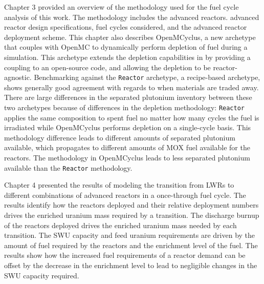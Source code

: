 Chapter 3 provided an overview of the methodology used for the fuel 
cycle analysis of this work. The methodology includes the 
advanced reactors. advanced reactor design specifications,
fuel cycles considered, and the 
advanced reactor deployment scheme. This chapter also 
describes OpenMCyclus, a new archetype that couples \Cyclus with 
OpenMC to dynamically perform depletion of fuel during a simulation. 
This archetype extends the depletion capabilities in 
\Cyclus by providing a coupling to an open-source code, and 
allowing the depletion to be reactor-agnostic. 
Benchmarking against the \Cycamore \texttt{Reactor} archetype, 
a recipe-based archetype, shows generally good agreement with 
regards to when materials are traded away. There 
are large differences in the separated plutonium inventory between 
these two archetypes because of differences in the 
depletion methodology: \Cycamore \texttt{Reactor} applies the 
same composition to spent fuel no matter how many cycles the 
fuel is irradiated while OpenMCyclus performs depletion on a 
single-cycle basis. This methodology difference leads to different 
amounts of separated plutonium available, which propagates 
to different amounts of \gls{MOX} fuel available for the 
reactors. The methodology in OpenMCyclus leads to less 
separated plutonium available than the \Cycamore 
\texttt{Reactor} methodology. 

Chapter 4 presented the results of modeling the transition from 
\glspl{LWR} to different combinations of advanced reactors in 
a once-through fuel cycle. 
The results identify how 
the reactors deployed and their relative deployment numbers drives 
the enriched uranium mass required by a transition. The discharge
burnup of the reactors deployed drives the enriched uranium 
mass needed by each transition. The \gls{SWU} capacity and 
feed uranium requirements are driven by the amount of fuel required 
by the reactors and the enrichment level of the fuel. The results 
show how the increased fuel requirements of a reactor demand can 
be offset by the decrease in the enrichment level to lead to 
negligible changes in the \gls{SWU} capacity required. 

